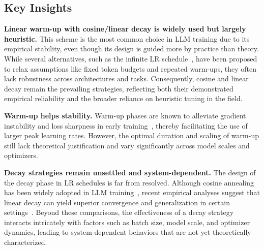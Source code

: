 

\subsection{Key Insights}

\noindent\textbf{Linear warm-up with cosine/linear decay is widely used but largely heuristic.}
This scheme is the most common choice in LLM training due to its empirical stability, even though its design is guided more by practice than theory. While several alternatives, such as the infinite LR schedule~\cite{ibrahim2024simple}, have been proposed to relax assumptions like fixed token budgets and repeated warm-ups, they often lack robustness across architectures and tasks. Consequently, cosine and linear decay remain the prevailing strategies, reflecting both their demonstrated empirical reliability and the broader reliance on heuristic tuning in the field.

\noindent\textbf{Warm-up helps stability.}
Warm-up phases are known to alleviate gradient instability and loss sharpness in early training~\cite{goyal2017accurate, gilmer2022loss, kalra2024warmup}, thereby facilitating the use of larger peak learning rates. However, the optimal duration and scaling of warm-up still lack theoretical justification and vary significantly across model scales and optimizers.

\noindent\textbf{Decay strategies remain unsettled and system-dependent.}
The design of the decay phase in LR schedules is far from resolved. Although cosine annealing has been widely adopted in LLM training~\cite{brown2020language, rae2021scaling, hoffmann2022training}, recent empirical analyses suggest that linear decay can yield superior convergence and generalization in certain settings~\cite{defazio2023optimal, bergsma2025straight}. Beyond these comparisons, the effectiveness of a decay strategy interacts intricately with factors such as batch size, model scale, and optimizer dynamics, leading to system-dependent behaviors that are not yet theoretically characterized.

